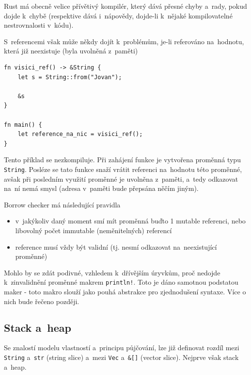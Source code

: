 \documentclass[a4paper, 12pt]{article} %
\newcommand{\rust}[1]{\texttt{#1}}
\begin{document}
            Rust má obecně velice přívětivý kompilér, který dává přesné chyby a~rady, pokud dojde k~chybě (respektive dává i~nápovědy, dojde-li k~nějaké kompilovatelné nestrovnalosti v~kódu).
            
            S~referencemi však může někdy dojít k~problémům, je-li referováno na~hodnotu, která již neexistuje (byla uvolněná z~paměti)
            \begin{verbatim}
fn visici_ref() -> &String {
    let s = String::from("Jovan");

    &s
}

fn main() {
    let reference_na_nic = visici_ref();
}
            \end{verbatim}
            \cite{dangle}
                
            Tento příklad se nezkompiluje. Při zahájení funkce je vytvořena proměnná typu \rust{String}. Posléze se tato funkce snaží vrátit referenci na~hodnotu této proměnné, avšak při posledním využití proměnné je uvolněna z~paměti, a~tedy odkazovat na~ní nemá smysl (adresa v~paměti bude přepsána něčím jiným).
    
            Borrow checker má následující pravidla
            \begin{itemize}
                \item v~jakýkoliv daný moment smí mít proměnná buďto 1 mutable referenci, nebo libovolný počet immutable (neměnitelných) referencí
                \item reference musí vždy být validní (tj. nesmí odkazovat na~neexistující proměnné)
            \end{itemize}
    
            Mohlo by se zdát podivné, vzhledem k~dřívějším úryvkům, proč nedojde k~zinvalidnění proměnné makrem \rust{println!}. Toto je dáno samotnou podstatou maker - toto makro slouží jako pouhá abstrakce pro zjednodušení syntaxe. Více o nich bude řečeno později.
            
        \subsection{Stack a~heap}
            Se znalostí modelu vlastností a~principu půjčování, lze již definovat rozdíl mezi \rust{String} a~\rust{str} (string slice) a~mezi \rust{Vec} a~\rust{&[]} (vector slice). Nejprve však stack a~heap.
                
\end{document}
